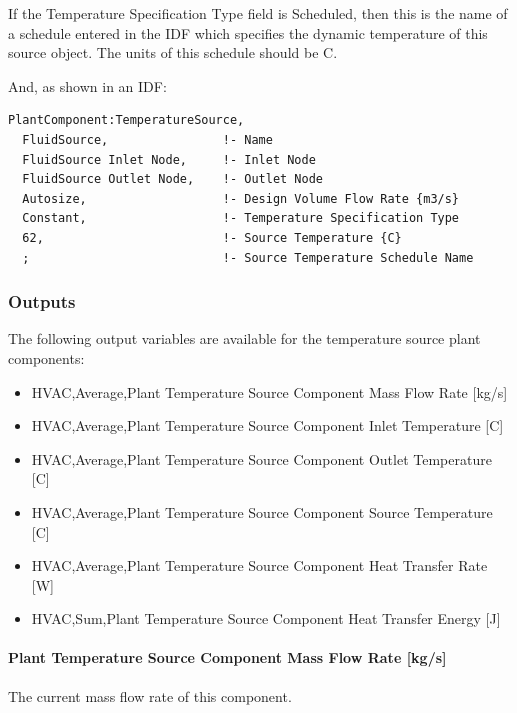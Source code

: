 If the Temperature Specification Type field is Scheduled, then this is the name of a schedule entered in the IDF which specifies the dynamic temperature of this source object. The units of this schedule should be C.

And, as shown in an IDF:

\begin{lstlisting}
PlantComponent:TemperatureSource,
  FluidSource,                !- Name
  FluidSource Inlet Node,     !- Inlet Node
  FluidSource Outlet Node,    !- Outlet Node
  Autosize,                   !- Design Volume Flow Rate {m3/s}
  Constant,                   !- Temperature Specification Type
  62,                         !- Source Temperature {C}
  ;                           !- Source Temperature Schedule Name
\end{lstlisting}

\subsubsection{Outputs}\label{outputs-16-000}

The following output variables are available for the temperature source plant components:

\begin{itemize}
    \item
    HVAC,Average,Plant Temperature Source Component Mass Flow Rate {[}kg/s{]}
    \item
    HVAC,Average,Plant Temperature Source Component Inlet Temperature {[}C{]}
    \item
    HVAC,Average,Plant Temperature Source Component Outlet Temperature {[}C{]}
    \item
    HVAC,Average,Plant Temperature Source Component Source Temperature {[}C{]}
    \item
    HVAC,Average,Plant Temperature Source Component Heat Transfer Rate {[}W{]}
    \item
    HVAC,Sum,Plant Temperature Source Component Heat Transfer Energy {[}J{]}
\end{itemize}

\paragraph{Plant Temperature Source Component Mass Flow Rate {[}kg/s{]}}\label{plant-temperature-source-component-mass-flow-rate-kgs}

The current mass flow rate of this component.

